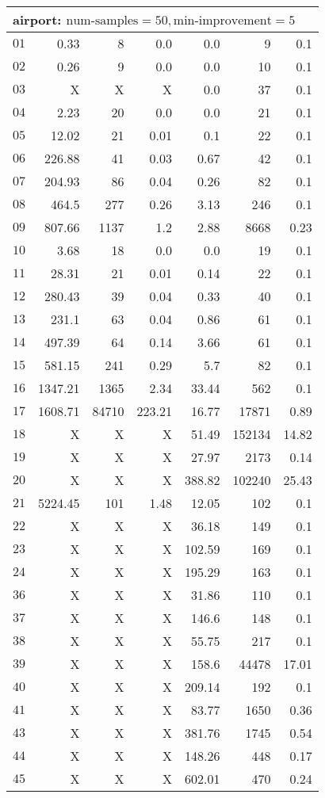 \begin{longtable}{|c||r|r|r||r|r|r|}
\multicolumn{7}{|l|}{airport: $\text{num-samples}=50,\text{min-improvement}=5$}\\\hline
$01$ & 0.33 & 8 & 0.0 & 0.0 & 9 & 0.1 \\\hline
$02$ & 0.26 & 9 & 0.0 & 0.0 & 10 & 0.1 \\\hline
$03$ &  X &  X &  X & 0.0 & 37 & 0.1 \\\hline
$04$ & 2.23 & 20 & 0.0 & 0.0 & 21 & 0.1 \\\hline
$05$ & 12.02 & 21 & 0.01 & 0.1 & 22 & 0.1 \\\hline
$06$ & 226.88 & 41 & 0.03 & 0.67 & 42 & 0.1 \\\hline
$07$ & 204.93 & 86 & 0.04 & 0.26 & 82 & 0.1 \\\hline
$08$ & 464.5 & 277 & 0.26 & 3.13 & 246 & 0.1 \\\hline
$09$ & 807.66 & 1137 & 1.2 & 2.88 & 8668 & 0.23 \\\hline
$10$ & 3.68 & 18 & 0.0 & 0.0 & 19 & 0.1 \\\hline
$11$ & 28.31 & 21 & 0.01 & 0.14 & 22 & 0.1 \\\hline
$12$ & 280.43 & 39 & 0.04 & 0.33 & 40 & 0.1 \\\hline
$13$ & 231.1 & 63 & 0.04 & 0.86 & 61 & 0.1 \\\hline
$14$ & 497.39 & 64 & 0.14 & 3.66 & 61 & 0.1 \\\hline
$15$ & 581.15 & 241 & 0.29 & 5.7 & 82 & 0.1 \\\hline
$16$ & 1347.21 & 1365 & 2.34 & 33.44 & 562 & 0.1 \\\hline
$17$ & 1608.71 & 84710 & 223.21 & 16.77 & 17871 & 0.89 \\\hline
$18$ &  X &  X &  X & 51.49 & 152134 & 14.82 \\\hline
$19$ &  X &  X &  X & 27.97 & 2173 & 0.14 \\\hline
$20$ &  X &  X &  X & 388.82 & 102240 & 25.43 \\\hline
$21$ & 5224.45 & 101 & 1.48 & 12.05 & 102 & 0.1 \\\hline
$22$ &  X &  X &  X & 36.18 & 149 & 0.1 \\\hline
$23$ &  X &  X &  X & 102.59 & 169 & 0.1 \\\hline
$24$ &  X &  X &  X & 195.29 & 163 & 0.1 \\\hline
$36$ &  X &  X &  X & 31.86 & 110 & 0.1 \\\hline
$37$ &  X &  X &  X & 146.6 & 148 & 0.1 \\\hline
$38$ &  X &  X &  X & 55.75 & 217 & 0.1 \\\hline
$39$ &  X &  X &  X & 158.6 & 44478 & 17.01 \\\hline
$40$ &  X &  X &  X & 209.14 & 192 & 0.1 \\\hline
$41$ &  X &  X &  X & 83.77 & 1650 & 0.36 \\\hline
$43$ &  X &  X &  X & 381.76 & 1745 & 0.54 \\\hline
$44$ &  X &  X &  X & 148.26 & 448 & 0.17 \\\hline
$45$ &  X &  X &  X & 602.01 & 470 & 0.24 \\\hline


\end{longtable}
